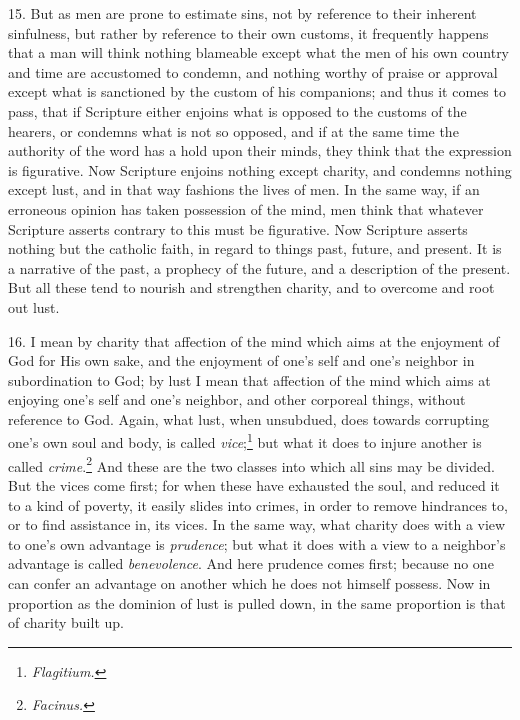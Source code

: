 15. But as men are prone to estimate sins, not by reference to their inherent sinfulness, but rather by reference to their own customs, it frequently happens that a man will think nothing blameable except what the men of his own country and time are accustomed to condemn, and nothing worthy of praise or approval except what is sanctioned by the custom of his companions; and thus it comes to pass, that if Scripture either enjoins what is opposed to the customs of the hearers, or condemns what is not so opposed, and if at the same time the authority of the word has a hold upon their minds, they think that the expression is figurative. Now Scripture enjoins nothing except charity, and condemns nothing except lust, and in that way fashions the lives of men. In the same way, if an erroneous opinion has taken possession of the mind, men think that whatever Scripture asserts contrary to this must be figurative. Now Scripture asserts nothing but the catholic faith, in regard to things past, future, and present. It is a narrative of the past, a prophecy of the future, and a description of the present. But all these tend to nourish and strengthen charity, and to overcome and root out lust.

16. I mean by charity that affection of the mind which aims at the enjoyment of God for His own sake, and the enjoyment of one’s self and one’s neighbor in subordination to God; by lust I mean that affection of the mind which aims at enjoying one’s self and one’s neighbor, and other corporeal things, without reference to God. Again, what lust, when unsubdued, does towards corrupting one’s own soul and body, is called \emph{vice};\footnote{\emph{Flagitium.}} but what it does to injure another is called \emph{crime}.\footnote{\emph{Facinus.}} And these are the two classes into which all sins may be divided. But the vices come first; for when these have exhausted the soul, and reduced it to a kind of poverty, it easily slides into crimes, in order to remove hindrances to, or to find assistance in, its vices. In the same way, what charity does with a view to one’s own advantage is \emph{ prudence}; but what it does with a view to a neighbor’s advantage is called \emph{benevolence}. And here prudence comes first; because no one can confer an advantage on another which he does not himself possess. Now in proportion as the dominion of lust is pulled down, in the same proportion is that of charity built up.


